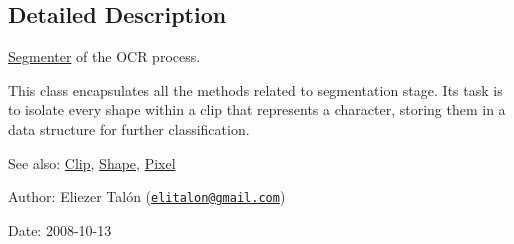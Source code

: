 \subsection{Detailed Description}
\hyperlink{class_segmenter}{Segmenter} of the OCR process. 

This class encapsulates all the methods related to segmentation stage. Its task is to isolate every shape within a clip that represents a character, storing them in a data structure for further classification.

\begin{Desc}
\item[See also:]\hyperlink{class_clip}{Clip}, \hyperlink{class_shape}{Shape}, \hyperlink{_pixel_8hpp_535e59456e3e633842529cfa8ea103c4}{Pixel}\end{Desc}
\begin{Desc}
\item[Author:]Eliezer Talón (\href{mailto:elitalon@gmail.com}{\tt elitalon@gmail.com}) \end{Desc}
\begin{Desc}
\item[Date:]2008-10-13 \end{Desc}


